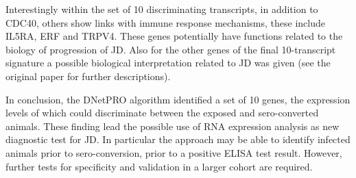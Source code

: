 \documentclass{standalone}
\begin{document}
Interestingly within the set of 10 discriminating transcripts, in addition to CDC40, others show links with immune response mechanisms, these include IL5RA, ERF and TRPV4.
These genes potentially have functions related to the biology of progression of JD.
Also for the other genes of the final 10-transcript signature a possible biological interpretation related to JD was given (see the original paper for further descriptions).

In conclusion, the DNetPRO algorithm identified a set of 10 genes, the expression levels of which could discriminate between the exposed and sero-converted animals.
These finding lead the possible use of RNA expression analysis as new diagnostic test for JD.
In particular the approach may be able to identify infected animals prior to sero-conversion, prior to a positive ELISA test result.
However, further tests for specificity and validation in a larger cohort are required.



\end{document}
